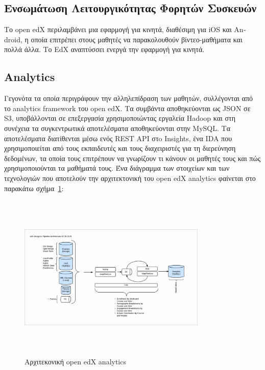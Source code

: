 \documentclass[12pt]{report}
\begin{document}
\subsection{Ενσωμάτωση Λειτουργικότητας Φορητών Συσκευών} Το \textlatin{open edX} περιλαμβάνει μια εφαρμογή για κινητά, διαθέσιμη για \textlatin{iOS} και \textlatin{Android}, η οποία επιτρέπει στους μαθητές να παρακολουθούν βίντεο-μαθήματα και πολλά άλλα. Το \textlatin{EdX} αναπτύσσει ενεργά την εφαρμογή για κινητά.

\subsection{\textlatin{Analytics}}
Γεγονότα τα οποία περιγράφουν την αλληλεπίδραση των μαθητών, συλλέγονται από το \textlatin{analytics framework} του \textlatin{open edX}. Τα συμβάντα αποθηκεύονται ως \textlatin{JSON} σε \textlatin{S3}, υποβάλλονται σε επεξεργασία χρησιμοποιώντας εργαλεία \textlatin{Hadoop} και στη συνέχεια τα συγκεντρωτικά αποτελέσματα αποθηκεύονται στην \textlatin{MySQL}. Τα αποτελέσματα διατίθενται μέσω ενός \textlatin{REST API} στo \textlatin{Insights}, ένα \textlatin{IDA} που χρησιμοποιείται από τους εκπαιδευτές και τους διαχειριστές για τη διερεύνηση δεδομένων, τα οποία τους επιτρέπουν να γνωρίζουν τι κάνουν οι μαθητές τους και πώς χρησιμοποιούνται τα μαθήματά τους. Ένα διάγραμμα των στοιχείων και των τεχνολογιών που αποτελούν την αρχιτεκτονική του \textlatin{open edX analytics} φαίνεται στο παρακάτω σχήμα~\ref{fig:edx_analytics_arch}:
\begin{figure}[h]
\centering
\includegraphics[width=0.8\textwidth, height=8cm]{edx-architecture-analytics}
\caption{Αρχιτεκονική \textlatin{open edX analytics}}
\label{fig:edx_analytics_arch}
\end{figure}
\end{document}

